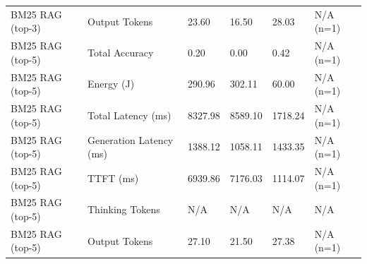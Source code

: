 \begin{table}
\begin{tabular}{llllll}
BM25 RAG (top-3) & Output Tokens & 23.60 & 16.50 & 28.03 & N/A (n=1) \\
BM25 RAG (top-5) & Total Accuracy & 0.20 & 0.00 & 0.42 & N/A (n=1) \\
BM25 RAG (top-5) & Energy (J) & 290.96 & 302.11 & 60.00 & N/A (n=1) \\
BM25 RAG (top-5) & Total Latency (ms) & 8327.98 & 8589.10 & 1718.24 & N/A (n=1) \\
BM25 RAG (top-5) & Generation Latency (ms) & 1388.12 & 1058.11 & 1433.35 & N/A (n=1) \\
BM25 RAG (top-5) & TTFT (ms) & 6939.86 & 7176.03 & 1114.07 & N/A (n=1) \\
BM25 RAG (top-5) & Thinking Tokens & N/A & N/A & N/A & N/A \\
BM25 RAG (top-5) & Output Tokens & 27.10 & 21.50 & 27.38 & N/A (n=1) \\
\bottomrule
\end{tabular}
\end{table}
